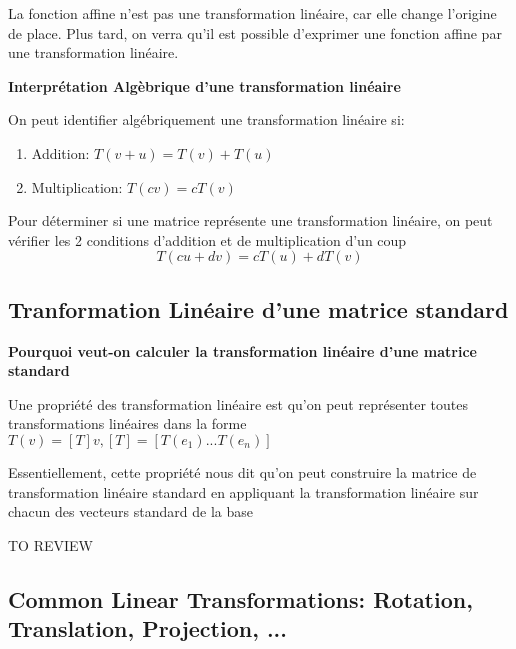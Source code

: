 \documentclass{article}
\begin{document}
\begin{proposition}[f(x) = ax+b n'est pas une transformation linéaire]
    La fonction affine n'est pas une transformation linéaire, car elle change
    l'origine de place. Plus tard, on verra qu'il est possible d'exprimer
    une fonction affine par une transformation linéaire.
\end{proposition}

\textbf{Interprétation Algèbrique d'une transformation linéaire}

On peut identifier algébriquement une transformation linéaire si:
\begin{enumerate}
    \item Addition: $ T(v+u) = T(v) + T(u)$
    \item Multiplication: $ T(cv) = c T(v) $
\end{enumerate}

\begin{remark}
    Pour déterminer si une matrice représente une transformation linéaire, on
    peut vérifier les 2 conditions d'addition et de multiplication d'un coup
    $$ T(cu + dv) = cT(u) + dT(v) $$
\end{remark}

\subsection{Tranformation Linéaire d'une matrice standard}

\textbf{Pourquoi veut-on calculer la transformation linéaire d'une matrice
standard}

Une propriété des transformation linéaire est qu'on peut représenter toutes
transformations linéaires dans la forme
$ T(v) = [T]v, [T] = [T(e_1) ... T(e_n)] $

Essentiellement, cette propriété nous dit qu'on peut construire la matrice
de transformation linéaire standard en appliquant la transformation linéaire
sur chacun des vecteurs standard de la base

\begin{intuition}
    TO REVIEW
\end{intuition}


\subsection{Common Linear Transformations: Rotation, Translation, Projection, ...}
\end{document}
